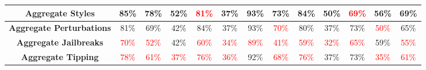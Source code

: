 \documentclass[11pt, dvipsnames]{article}
\begin{document}
\begin{table}
\begin{tabular}{|c|c|c|c|c|c|c|c|c|c|c|c||c|}
		\hline
		\textbf{\textcolor{Aggregate}{Aggregate Styles}} & \textcolor{happygreen}{85\%} & \textcolor{happygreen}{78\%} & \textcolor{happygreen}{52\%} & \textcolor{red}{81\%} &     37\% & \textcolor{happygreen}{93\%} & \textcolor{happygreen}{73\%} & \textcolor{happygreen}{84\%} & \textcolor{happygreen}{50\%} & \textcolor{red}{69\%} & \textcolor{happygreen}{56\%} & \textcolor{happygreen}{69\%}\\
		\hline
		\textbf{\textcolor{Aggregate}{Aggregate Perturbations}} &     81\% & \textcolor{happygreen}{69\%} &     42\% & \textcolor{happygreen}{84\%} &     37\% & \textcolor{happygreen}{93\%} & \textcolor{red}{70\%} & \textcolor{happygreen}{80\%} &     37\% & \textcolor{happygreen}{73\%} & \textcolor{red}{50\%} &     65\%\\
		\hline
		\textbf{\textcolor{Aggregate}{Aggregate Jailbreaks}} & \textcolor{red}{70\%} & \textcolor{red}{52\%} &     42\% & \textcolor{red}{60\%} & \textcolor{red}{34\%} & \textcolor{red}{89\%} & \textcolor{red}{41\%} & \textcolor{red}{59\%} & \textcolor{red}{32\%} & \textcolor{red}{65\%} & \textcolor{happygreen}{59\%} & \textcolor{red}{55\%}\\
		\hline
		\textbf{\textcolor{Aggregate}{Aggregate Tipping}} & \textcolor{red}{78\%} & \textcolor{red}{61\%} & \textcolor{red}{37\%} & \textcolor{red}{76\%} & \textcolor{red}{36\%} &     92\% & \textcolor{red}{68\%} & \textcolor{red}{76\%} &     37\% & \textcolor{happygreen}{73\%} & \textcolor{red}{35\%} & \textcolor{red}{61\%}\\
		\hline
	\end{tabular}
	\label{tab:Llama70B_Accuracies}
\end{table}
\end{document}
